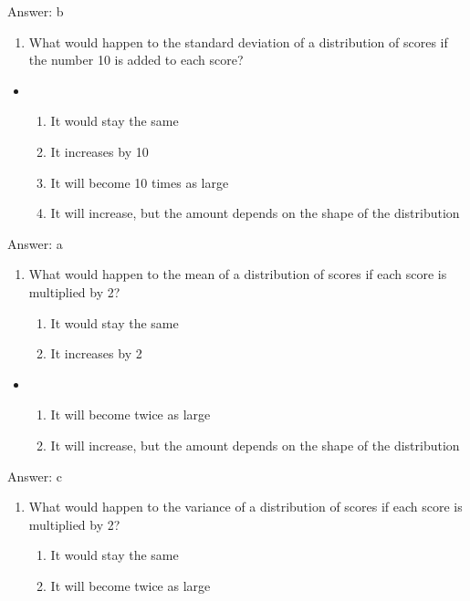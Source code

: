 \documentclass[]{article}
\providecommand{\tightlist}{%
  \setlength{\itemsep}{0pt}\setlength{\parskip}{0pt}}
\begin{document}
Answer: b

\begin{enumerate}
\def\labelenumi{\arabic{enumi}.}
\setcounter{enumi}{14}
\tightlist
\item
  What would happen to the standard deviation of a distribution of
  scores if the number 10 is added to each score?
\end{enumerate}

\begin{itemize}
\item
  \begin{enumerate}
  \def\labelenumi{\alph{enumi}.}
  \item
    It would stay the same
  \item
    It increases by 10
  \item
    It will become 10 times as large
  \item
    It will increase, but the amount depends on the shape of the
    distribution
  \end{enumerate}
\end{itemize}

Answer: a

\begin{enumerate}
\def\labelenumi{\arabic{enumi}.}
\setcounter{enumi}{15}
\item
  What would happen to the mean of a distribution of scores if each
  score is multiplied by 2?

  \begin{enumerate}
  \def\labelenumii{\alph{enumii}.}
  \tightlist
  \item
    It would stay the same
  \item
    It increases by 2
  \end{enumerate}
\end{enumerate}

\begin{itemize}
\item
  \begin{enumerate}
  \def\labelenumi{\alph{enumi}.}
  \setcounter{enumi}{2}
  \tightlist
  \item
    It will become twice as large
  \item
    It will increase, but the amount depends on the shape of the
    distribution
  \end{enumerate}
\end{itemize}

Answer: c

\begin{enumerate}
\def\labelenumi{\arabic{enumi}.}
\setcounter{enumi}{16}
\item
  What would happen to the variance of a distribution of scores if each
  score is multiplied by 2?

  \begin{enumerate}
  \def\labelenumii{\alph{enumii}.}
  \tightlist
  \item
    It would stay the same
  \item
    It will become twice as large
  \end{enumerate}
\end{enumerate}
\end{document}
